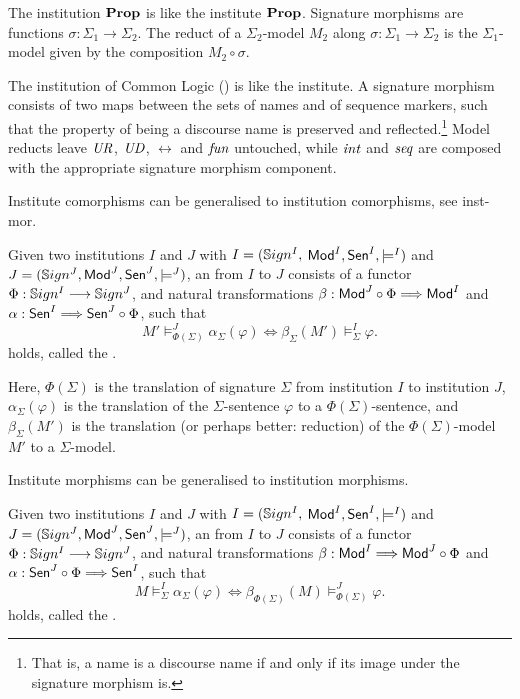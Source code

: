 \documentclass[10pt,%
\ifpretendfinal
final%
\else
draft%
\fi,
]{scrreprt}
\newcommand{\bref}[1]{[\ref{#1}]}
\renewcommand{\bref}[1]{#1}
\begin{document}
\begin{definition}\label{Prop}
The institution $\mathbf{Prop}$ is like the institute $\mathbf{Prop}$.
Signature morphisms are functions
$\sigma:{\Sigma_1}\to{\Sigma_2}$. The reduct of a $\Sigma_2$-model
$M_2$ along $\sigma:{\Sigma_1}\to{\Sigma_2}$ is the $\Sigma_1$-model
given by the composition $M_2\circ\sigma$. 
\end{definition}

\begin{definition}\label{CommonLogic}
The institution of Common Logic (\Clogic) is like the institute.
A \Clogic signature morphism consists of two maps
between the sets of names and of sequence markers, such that the property of being a discourse name
is preserved and reflected.\footnote{That is, a name is a discourse
name if and only if its image under the signature morphism is.}  
 Model reducts leave $\mathit{UR}$, $\mathit{UD}$, $\rel$ and $\mathit{fun}$
untouched, while $\mathit{int}$ and $\mathit{seq}$ are composed with the appropriate
signature morphism component.
\end{definition}
%

Institute comorphisms can be generalised to institution comorphisms,
see \bref{inst-mor}.  

\begin{definition} Given two institutions $I$ and $J$ with $I = (\mathbb{S}ign^I,$ $ \mathsf{Mod}^I, \mathsf{Sen}^I, \models^I)$ and $J = (\mathbb{S}ign^J, \mathsf{Mod}^J,
\mathsf{Sen}^J, \models^J)$, an  from $I$ to
$J$ consists of a functor $\Phi : \mathbb{S}ign^I \longrightarrow \mathbb{S}ign^J$, and
natural transformations $\beta: \mathsf{Mod}^J \circ \Phi \Longrightarrow \mathsf{Mod}^I$
and $\alpha: \mathsf{Sen}^I \Longrightarrow \mathsf{Sen}^J \circ \Phi$, such that 
$$ M'\models^{J}_{\Phi(\Sigma)}\alpha_{\Sigma}(\varphi) \Leftrightarrow
\beta_{\Sigma}(M')\models^I_{\Sigma}\varphi.
$$
holds, called the .
\end{definition}

\noindent
Here, $\Phi(\Sigma)$ is the translation of signature $\Sigma$ from
institution $I$ to institution $J$, $\alpha_{\Sigma}(\varphi)$ is the
translation of the $\Sigma$-sentence $\varphi$ to a
$\Phi(\Sigma)$-sentence, and $\beta_{\Sigma}(M')$ is the translation
(or perhaps better: reduction) of the $\Phi(\Sigma)$-model $M'$ to a
$\Sigma$-model.

Institute morphisms can be generalised to institution morphisms.

\begin{definition} Given two institutions $I$ and $J$ with $I = (\mathbb{S}ign^I,$ $ \mathsf{Mod}^I, \mathsf{Sen}^I, \models^I)$ and $J = (\mathbb{S}ign^J, \mathsf{Mod}^J,
\mathsf{Sen}^J, \models^J)$, an  from $I$ to
$J$ consists of a functor $\Phi : \mathbb{S}ign^I \longrightarrow \mathbb{S}ign^J$, and
natural transformations $\beta: \mathsf{Mod}^I \Longrightarrow \mathsf{Mod}^J \circ \Phi$
and $\alpha:  \mathsf{Sen}^J \circ \Phi \Longrightarrow \mathsf{Sen}^I $, such that 
$$ M\models^{I}_{\Sigma}\alpha_{\Sigma}(\varphi) \Leftrightarrow
\beta_{\Phi(\Sigma)}(M)\models^J_{\Phi(\Sigma)}\varphi.
$$
holds, called the .
\end{definition}
\end{document}
